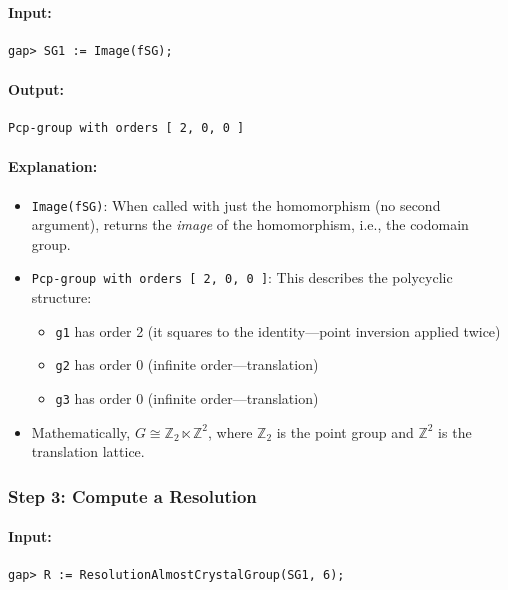 \documentclass{SciPost}
\begin{document}
\paragraph{Input:}
\begin{verbatim}
gap> SG1 := Image(fSG);
\end{verbatim}

\paragraph{Output:}
\begin{verbatim}
Pcp-group with orders [ 2, 0, 0 ]
\end{verbatim}

\paragraph{Explanation:}
\begin{itemize}
    \item \texttt{Image(fSG)}: When called with just the homomorphism (no second argument), returns the \textit{image} of the homomorphism, i.e., the codomain group.
    \item \texttt{Pcp-group with orders [ 2, 0, 0 ]}: This describes the polycyclic structure:
    \begin{itemize}
        \item \texttt{g1} has order 2 (it squares to the identity---point inversion applied twice)
        \item \texttt{g2} has order 0 (infinite order---translation)
        \item \texttt{g3} has order 0 (infinite order---translation)
    \end{itemize}
    \item Mathematically, $G \cong \mathbb{Z}_2 \ltimes \mathbb{Z}^2$, where $\mathbb{Z}_2$ is the point group and $\mathbb{Z}^2$ is the translation lattice.
\end{itemize}

\subsubsection{Step 3: Compute a Resolution}

\paragraph{Input:}
\begin{verbatim}
gap> R := ResolutionAlmostCrystalGroup(SG1, 6);
\end{verbatim}
\end{document}
